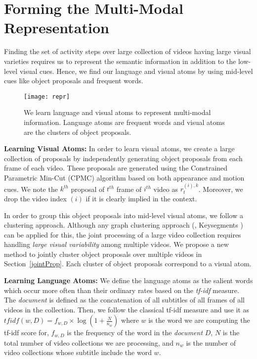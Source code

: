 
\vspace{-1mm}
\section{Forming the Multi-Modal Representation}
\label{atoms}
\vspace{-1mm}

Finding the set of activity steps over large collection of videos having large visual varieties requires us to represent the semantic information in addition to the low-level visual cues. Hence, we find our language and visual atoms by using mid-level cues like object proposals and frequent words.

\begin{figure}[h]
  \texttt{[image: repr]}
  \vspace{-8mm}
  \caption{We learn language and visual atoms to represent multi-modal information. Language atoms are frequent words and visual atoms are the clusters of object proposals.}
  \vspace{-3mm}
\label{fig:overview}
\end{figure}

\noindent\textbf{Learning Visual Atoms:} In order to learn visual atoms, we create a large collection of  proposals by independently generating object proposals from each frame of each video. These proposals are generated using the Constrained Parametric Min-Cut (CPMC) \cite{cpmc} algorithm based on both appearance and motion cues. We note the $k^{th}$ proposal of $t^{th}$ frame of $i^{th}$ video as $r^{(i),k}_t$. Moreover, we drop the video index $(i)$ if it is clearly implied in the context.

In order to group this object proposals into mid-level visual atoms, we follow a clustering approach. Although any graph clustering approach (\eg, Keysegments \cite{keysegments}) can be applied for this, the joint processing of a large video collection requires handling \emph{large visual variability} among multiple videos. We propose a new method to jointly cluster object proposals over multiple videos in Section~\ref{jointProp}. Each cluster of object proposals correspond to a visual atom.

\noindent\textbf{Learning Language Atoms:}
We define the language atoms as the salient words which occur more often than their ordinary rates based on the \emph{tf-idf} measure. The \emph{document} is defined as the concatenation of all subtitles of all frames of all videos in the collection. Then, we follow the classical tf-idf measure and use it as $tfidf(w,D)=f_{w,D} \times \log \left( 1+ \frac{N}{n_{w}}\right)$ where $w$ is the word we are computing the tf-idf score for, $f_{w,D}$ is the frequency of the word in the \emph{document} $D$, $N$ is the total number of video collections we are processing, and $n_{w}$ is the number of video collections whose subtitle include the word $w$.

